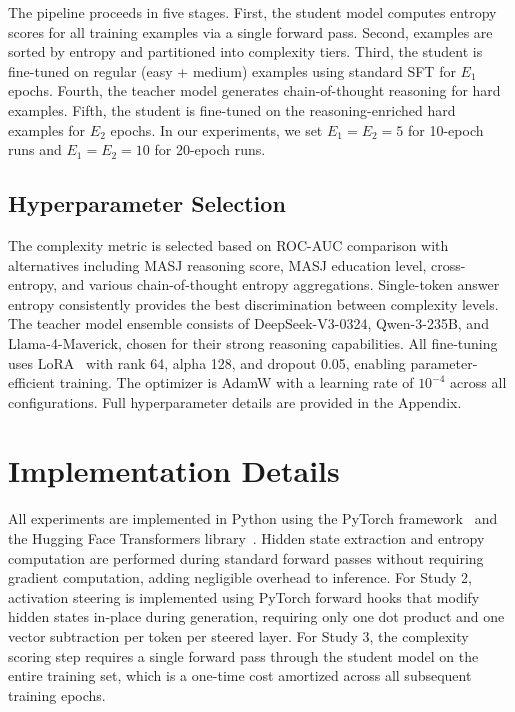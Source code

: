 The pipeline proceeds in five stages. First, the student model computes entropy scores for all training examples via a single forward pass. Second, examples are sorted by entropy and partitioned into complexity tiers. Third, the student is fine-tuned on regular (easy + medium) examples using standard SFT for $E_1$ epochs. Fourth, the teacher model generates chain-of-thought reasoning for hard examples. Fifth, the student is fine-tuned on the reasoning-enriched hard examples for $E_2$ epochs. In our experiments, we set $E_1 = E_2 = 5$ for 10-epoch runs and $E_1 = E_2 = 10$ for 20-epoch runs.

\subsection{Hyperparameter Selection}

The complexity metric is selected based on ROC-AUC comparison with alternatives including MASJ reasoning score, MASJ education level, cross-entropy, and various chain-of-thought entropy aggregations. Single-token answer entropy consistently provides the best discrimination between complexity levels. The teacher model ensemble consists of DeepSeek-V3-0324, Qwen-3-235B, and Llama-4-Maverick, chosen for their strong reasoning capabilities. All fine-tuning uses LoRA~\cite{hu2022lora} with rank 64, alpha 128, and dropout 0.05, enabling parameter-efficient training. The optimizer is AdamW with a learning rate of $10^{-4}$ across all configurations. Full hyperparameter details are provided in the Appendix.

\section{Implementation Details}

All experiments are implemented in Python using the PyTorch framework~\cite{paszke2019pytorch} and the Hugging Face Transformers library~\cite{wolf2020transformers}. Hidden state extraction and entropy computation are performed during standard forward passes without requiring gradient computation, adding negligible overhead to inference. For Study 2, activation steering is implemented using PyTorch forward hooks that modify hidden states in-place during generation, requiring only one dot product and one vector subtraction per token per steered layer. For Study 3, the complexity scoring step requires a single forward pass through the student model on the entire training set, which is a one-time cost amortized across all subsequent training epochs.
